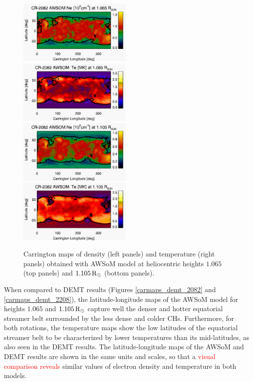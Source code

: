 \documentclass[namedreferences]{solarphysics}
\def\edit#1{\textcolor{Red}{#1}}
\newcommand{\mrsun}{{\rm R_\odot}}
\begin{document}
\begin{article}
\begin{figure}[h!]
\begin{center}
\includegraphics[width=0.495\textwidth]{figs/map_Ne_awsom_2082_185_short_1065_Rsun.pdf}
\includegraphics[width=0.495\textwidth]{figs/map_Te_awsom_2082_185_short_1065_Rsun.pdf}
\includegraphics[width=0.495\textwidth]{figs/map_Ne_awsom_2082_185_short_1105_Rsun.pdf}
\includegraphics[width=0.495\textwidth]{figs/map_Te_awsom_2082_185_short_1105_Rsun.pdf}
\caption{Carrington maps of density (left panels) and temperature (right panels) obtained with AWSoM model at heliocentric heights $1.065$ (top panels) and $1.105\,\mrsun$ (bottom panels).}
\label{carmaps_awsom_2082}
\end{center}
\end{figure}

{When compared to DEMT results (Figures \ref{carmaps_demt_2082} and \ref{carmaps_demt_2208}), the latitude-longitude maps of the AWSoM model for heights $1.065$ and $1.105\,\mrsun$ capture well the denser and hotter equatorial streamer belt surrounded by the less dense and colder CHs. Furthermore, for both rotations, the temperature maps show the low latitudes of the equatorial streamer belt to be characterized by lower temperatures than its mid-latitudes, as also seen in the DEMT results. The latitude-longitude maps of the AWSoM and DEMT results are shown in the same units and scales, so that a \edit{visual comparison reveals} similar values of electron density and temperature in both models.}


\end{article}
\end{document}

